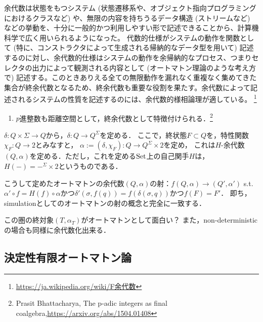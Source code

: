 \documentclass[uplatex, dvipdfmx]{jsreport}
\begin{document}
\begin{example}[余代数の例]
    余代数は状態をもつシステム (状態遷移系や、オブジェクト指向プログラミングにおけるクラスなど) や、無限の内容を持ちうるデータ構造 (ストリームなど) などの挙動を、十分に一般的かつ利用しやすい形で記述できることから、計算機科学で広く用いられるようになった。
    代数的仕様がシステムの動作を関数として (特に、コンストラクタによって生成される帰納的なデータ型を用いて) 記述するのに対し、余代数的仕様はシステムの動作を余帰納的なプロセス、つまりセレクタの出力によって観測される内容として (オートマトン理論のような考え方で) 記述する。このときありえる全ての無限動作を漏れなく重複なく集めてきた集合が終余代数となるため、終余代数も重要な役割を果たす。余代数によって記述されるシステムの性質を記述するのには、余代数的様相論理が適している。 
    \footnote{\url{https://ja.wikipedia.org/wiki/F余代数}}
    \begin{enumerate}
        \item $p$進整数も距離空間として，終余代数として特徴付けられる．\footnote{Prasit Bhattacharya, The p-adic integers as final coalgebra,\url{https://arxiv.org/abs/1504.01408}}
    \end{enumerate}
\end{example}

\begin{definition}
    $\delta:Q\times\Sigma\to Q$から，$\delta:Q\to Q^\Sigma$を定める．
    ここで，終状態$F\subset Q$を，特性関数$\chi_F:Q\to 2$とみなすと，
    $\alpha:=(\delta,\chi_F):Q\to Q^\Sigma\times 2$を定め，
    これは$H$-余代数$(Q,\alpha)$を定める．ただし，これを定める$\mathrm{Set}$上の自己関手$H$は，$H(-)=-^\Sigma\times 2$というものである．
\end{definition}
\begin{remark}[２つの定義の等価性]
    こうして定めたオートマトンの余代数$(Q,\alpha)$の射：$f(Q,\alpha)\to(Q',\alpha')$ s.t. $\alpha'\circ f=H(f)\circ\alpha$かつ$\delta'(\sigma,f(q))=f(\delta(\sigma,q))$かつ$f(F)=F'$．
    即ち，simulationとしてのオートマトンの射の概念と完全に一致する．
\end{remark}

この圏の終対象$(T,\alpha_T)$がオートマトンとして面白い？
また，non-deterministicの場合も同様に余代数化出来る．

\subsection{決定性有限オートマトン論}
\end{document}
